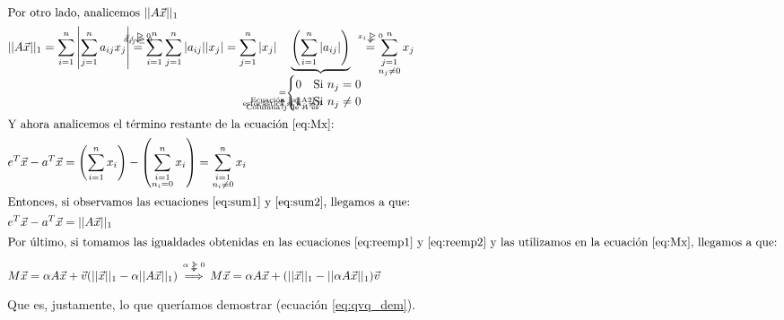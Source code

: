 \begin{align}
    \intertext{Por otro lado, analicemos $||A\vec{x}||_1$}
    &\begin{aligned}
        ||A\vec{x}||_1 &= \sum_{i=1}^{n} \left|\sum_{j=1}^n a_{ij}x_j\right|
            \overarrow[=][\downarrow]{$a_{ij}\geq 0$\\[-15pt]\tiny$x_j\geq 0$}
                \sum_{i=1}^{n} \sum_{j=1}^n |a_{ij}| |x_j|
            =
                \sum_{j=1}^{n}|x_j| \underbrace{\left(\sum_{i=1}^n|a_{ij}|\right)}_{
                    \underarrow[=][\uparrow]{Columna $j$ de $A$ es\\[-15pt]\tiny
                    estoc\'astica si $n_j\neq 0$\\[-15pt]\tiny
                    Ecuaci\'on \ref{eq:A2}}
                    \begin{cases}
                        0 &\text{Si $n_j = 0$}\\
                        1 &\text{Si $n_j\neq 0$}
                    \end{cases}
                }
            \overarrow[=][\downarrow]{$x_i\geq 0$}
                \sum_{\substack{j=1\\n_j\neq 0}}^n x_j\label{eq:sum1}
    \end{aligned}\\
    \intertext{Y ahora analicemos el t\'ermino restante de la ecuaci\'on
    \ref{eq:Mx}:}
    &e^T\vec{x}-a^T\vec{x}
        = \left(\sum_{i=1}^{n}x_i\right)
            - \left(\sum_{\substack{i=1\\n_i=0}}^n x_i\right)
        = \sum_{\substack{i=1\\n_i\neq 0}}^n x_i\label{eq:sum2}\\
    \intertext{Entonces, si observamos las ecuaciones \ref{eq:sum1} y
    \ref{eq:sum2}, llegamos a que:}
    &e^T\vec{x}-a^T\vec{x} = ||A\vec{x}||_1\label{eq:reemp2}\\
    \intertext{Por \'ultimo, si tomamos las igualdades obtenidas en las
    ecuaciones \ref{eq:reemp1} y \ref{eq:reemp2} y las utilizamos en la
    ecuaci\'on \ref{eq:Mx}, llegamos a que:}
    &M\vec{x} =
        \alpha A\vec{x} + \vec{v}(||\vec{x}||_1 - \alpha||A\vec{x}||_1)
    \overarrow[\implies][\downarrow]{$\alpha\geq 0$}
    M\vec{x} =
        \alpha A\vec{x} + (||\vec{x}||_1 - ||\alpha A\vec{x}||_1)\vec{v}
\end{align}

\par Que es, justamente, lo que quer\'iamos demostrar (ecuaci\'on \ref{eq:qvq_dem}).

